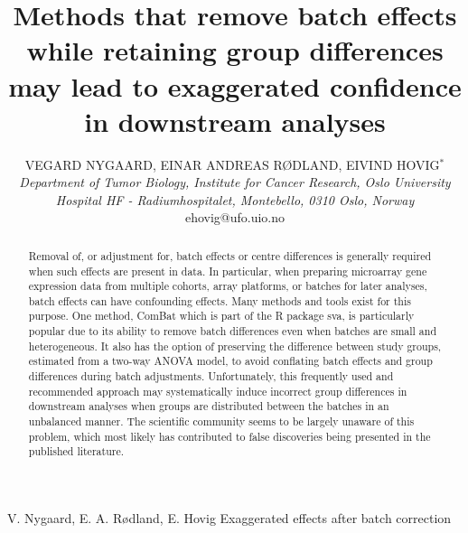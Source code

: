 \documentclass{bio}
\begin{document}
\title{Methods that remove batch effects while retaining group differences may lead
to exaggerated confidence in downstream analyses
}

\author{VEGARD NYGAARD, EINAR ANDREAS RØDLAND, EIVIND HOVIG$^\ast$\\[4pt]
\textit{Department of Tumor Biology,
Institute for Cancer Research,
Oslo University Hospital HF - Radiumhospitalet,
Montebello,
0310 Oslo,
Norway}
\\[2pt]
{ehovig@ufo.uio.no}}


\markboth%
{V. Nygaard, E. A. Rødland, E. Hovig}
{Exaggerated effects after batch correction}


\maketitle



\begin{abstract}
{Removal of, or adjustment for, batch effects or centre differences is generally required when such effects are present in data. In particular, when preparing microarray gene expression data from multiple cohorts, array platforms, or batches for later analyses, batch effects can have confounding effects. Many methods and tools exist for this purpose. One method, ComBat which is part of the R package sva, is particularly popular due to its ability to remove batch differences even when batches are small and heterogeneous. It also has the option of preserving the difference between study groups, estimated from a two-way ANOVA model, to avoid conflating batch effects and group differences during batch adjustments. Unfortunately, this frequently used and recommended approach may systematically induce incorrect group differences in downstream analyses when groups are distributed between the batches in an unbalanced manner. The scientific community seems to be largely unaware of this problem, which most likely has contributed to false discoveries being presented in the published literature.
}
\end{abstract}
\end{document}
